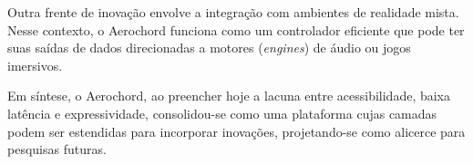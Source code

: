 Outra frente de inovação envolve a integração com ambientes de realidade mista. Nesse contexto, o Aerochord funciona como um controlador eficiente que pode ter suas saídas de dados direcionadas a motores (\textit{engines}) de áudio ou jogos imersivos.

Em síntese, o Aerochord, ao preencher hoje a lacuna entre acessibilidade, baixa latência e expressividade, consolidou-se como uma plataforma cujas camadas podem ser estendidas para incorporar inovações, projetando-se como alicerce para pesquisas futuras.